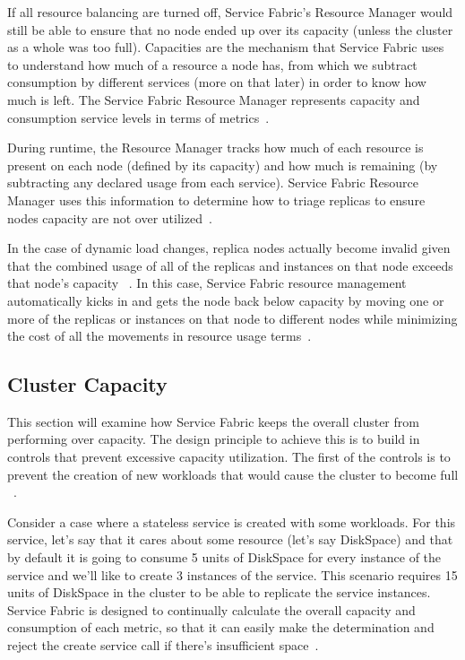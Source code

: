 If all resource balancing are turned off, Service Fabric's Resource
Manager would still be able to ensure that no node ended up over its
capacity (unless the cluster as a whole was too full). Capacities are
the mechanism that Service Fabric uses to understand how much of a
resource a node has, from which we subtract consumption by different
services (more on that later) in order to know how much is left. The
Service Fabric Resource Manager represents capacity and consumption
service levels in terms of metrics~\cite{hid-sp18-501-description}.

During runtime, the Resource Manager tracks how much of each resource
is present on each node (defined by its capacity) and how much is
remaining (by subtracting any declared usage from each service). 
Service Fabric 
Resource Manager uses this information to determine how to triage replicas
to ensure nodes capacity are not over utilized~\cite{hid-sp18-501-description}.

In the case of dynamic load changes, replica nodes actually become invalid 
given that the combined usage of all of the replicas
and instances on that node exceeds that node's capacity
~\cite{hid-sp18-501-description}. 
In this case,
Service Fabric resource management automatically kicks in and gets the
node back below capacity by moving one or more of the replicas or
instances on that node to different nodes while minimizing the cost 
of all the movements in resource usage terms~\cite{hid-sp18-501-description}.

\subsection{Cluster Capacity}
This section will examine how Service Fabric keeps the overall cluster
from performing over capacity. The design principle to achieve this
is to build in controls that prevent excessive capacity utilization. 
The first of the controls is to prevent the creation
of new workloads that would cause the cluster to become full
~\cite{hid-sp18-501-fig2and3}.

Consider a case where a stateless service is created with some
workloads.  For this service, let's say that it cares about some
resource (let’s say DiskSpace) and that by default it is going to
consume 5 units of DiskSpace for every instance of the service and
we'll like to create 3 instances of the service. This scenario
requires 15 units of DiskSpace in the cluster to be able to replicate
the service instances.  Service Fabric is designed to continually
calculate the overall capacity and consumption of each metric, so that
it can easily make the determination and reject the create service
call if there's insufficient space~\cite{hid-sp18-501-fig2and3}.

